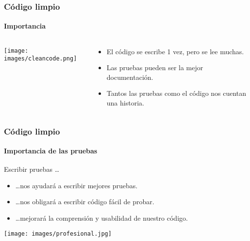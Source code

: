   \begin{frame}
   \frametitle{Código limpio}
   \framesubtitle{Importancia}

   \begin{columns}
    \begin{column}{4cm}
     \texttt{[image: images/cleancode.png]}
    \end{column}
    \begin{column}{7cm}
     \begin{itemize}
      \item El código se escribe 1 vez, pero se lee muchas.
      \item Las pruebas pueden ser la mejor documentación.
      \item Tantos las pruebas como el código nos cuentan una historia.
     \end{itemize}
    \end{column}
   \end{columns}
  \end{frame}


  \begin{frame}
   \frametitle{Código limpio}
   \framesubtitle{Importancia de las pruebas}

   Escribir pruebas \ldots
   \begin{itemize}
    \item \ldots nos ayudará a escribir mejores pruebas.
    \item \ldots nos obligará a escribir código fácil de probar.
    \item \ldots mejorará la comprensión y usabilidad de nuestro código.
   \end{itemize}
  \end{frame}

  \begin{frame}
   \begin{center}
    \texttt{[image: images/profesional.jpg]}
   \end{center}
  \end{frame}

